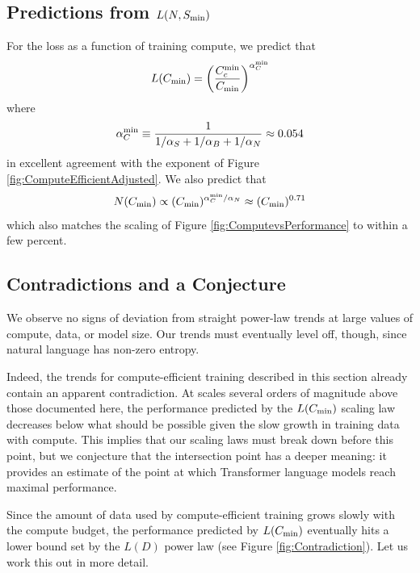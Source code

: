 \documentclass[english]{article}
\newcommand{\be}{\begin{equation}}
\newcommand{\ee}{\end{equation}}
\begin{document}
\subsection{Predictions from $L(N, S_{\rm min})$}

For the loss as a function of training compute, we predict that
\be
L(C_{\rm min}) = \left( \frac{C_c^{\rm min}}{C_{\rm min}} \right)^{\alpha_C^{\rm min}}
\ee
where
\be
\alpha_C^{\rm min} \equiv \frac{1}{1/\alpha_S + 1/\alpha_B + 1/\alpha_N} \approx 0.054
\ee
in excellent agreement with the exponent of Figure \ref{fig:ComputeEfficientAdjusted}.  We also predict that
\be
N(C_{\rm min}) \propto (C_{\rm min})^{\alpha_C^{\rm min} / \alpha_N} \approx  (C_{\rm min})^{0.71}
\ee
which also matches the scaling of Figure \ref{fig:ComputevsPerformance} to within a few percent.

\subsection{Contradictions and a Conjecture}

We observe no signs of deviation from straight power-law trends at large values of compute, data, or model size. Our trends must eventually level off, though, since natural language has non-zero entropy. 

Indeed, the trends for compute-efficient training described in this section already contain an apparent contradiction. At scales several orders of magnitude above those documented here, the performance predicted by the $L(C_{\rm min})$ scaling law decreases below what should be possible given the slow growth in training data with compute.  This implies that our scaling laws must break down before this point, but we conjecture that the intersection point has a deeper meaning: it provides an estimate of the point at which Transformer language models reach maximal performance.

Since the amount of data used by compute-efficient training grows  slowly with the compute budget, the performance predicted by $L(C_{\rm min})$ eventually hits a lower bound set by the $L(D)$ power law (see Figure \ref{fig:Contradiction}).  Let us work this out in more detail.
\end{document}
